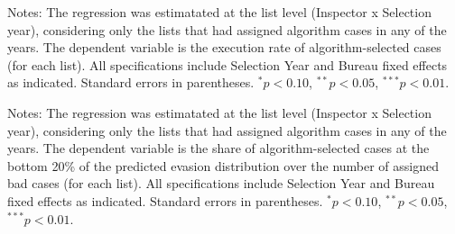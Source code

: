 \documentclass{article}
\newcommand{\OutPath}{Output/}%
\newcommand{\OutPath}{../Output/}%
\begin{document}
\begin{landscape}
    

\begin{table}[!htbp]\centering
\begin{threeparttable}
\caption{Existence of High potential case vrs overall execution rate [Desk audits]}
\label{tab:inspector_effort_disc_Desk}
\footnotesize


\begin{tablenotes}[flushleft]
\footnotesize
\item Notes: The regression was estimatated at the list level (Inspector x Selection year), considering only the lists that had assigned algorithm cases in any of the years. The dependent variable is the execution rate of algorithm-selected cases (for each list). All specifications include Selection Year and Bureau fixed effects as indicated. Standard errors in parentheses. 
$^{*}p<0.10$, $^{**}p<0.05$, $^{***}p<0.01$.
\end{tablenotes}
\end{threeparttable}
\end{table}



\begin{table}[H]\centering
\begin{threeparttable}
\caption{Existence of High potential case vrs execution rate of bottom 20\% cases [Desk audits]}
\label{tab:inspector_effort_disc_Desk}
\footnotesize


\begin{tablenotes}[flushleft]
\footnotesize
\item Notes: The regression was estimatated at the list level (Inspector x Selection year), considering only the lists that had assigned algorithm cases in any of the years. The dependent variable is the share of algorithm-selected
cases at the bottom 20\% of the predicted evasion distribution over the number of assigned bad cases (for each list). All specifications include Selection Year and Bureau fixed effects as indicated. Standard errors in parentheses. 
$^{*}p<0.10$, $^{**}p<0.05$, $^{***}p<0.01$.
\end{tablenotes}
\end{threeparttable}
\end{table}

    

\begin{table}[H]\centering
\begin{threeparttable}
\caption{Existence of High potential case vrs Executed bottom-20\% assigned (all)  [Desk audits]}
\label{tab:inspector_effort_disc_Desk}
\footnotesize



\end{threeparttable}
\end{table}
\end{landscape}
\end{document}
